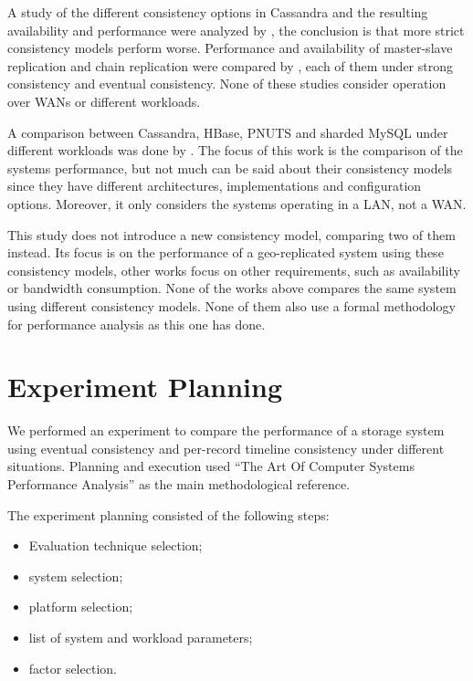 \documentclass[man,floatsintext,12pt]{apa6}
\begin{document}
A study of the different consistency options in Cassandra and the resulting
availability and performance were analyzed by \textcites{Beyer2011}, the
conclusion is that more strict consistency models perform worse. Performance
and availability of master-slave replication and chain replication were
compared by \textcites{vanRenesse2004}, each of them under strong consistency
and eventual consistency. None of these studies consider operation over WANs or
different workloads.

A comparison between Cassandra, HBase, PNUTS and sharded MySQL under different
workloads was done by \textcites{Cooper2010}. The focus of this work is the
comparison of the systems performance, but not much can be said about their
consistency models since they have different architectures, implementations and
configuration options. Moreover, it only considers the systems operating in a
LAN, not a WAN.

This study does not introduce a new consistency model, comparing two of them
instead. Its focus is on the performance of a geo-replicated system using these
consistency models, other works focus on other requirements, such as
availability or bandwidth consumption. None of the works above compares the
same system using different consistency models. None of them also use a formal
methodology for performance analysis as this one has done.

\section{Experiment Planning}

We performed an experiment to compare the performance of a storage system using
eventual consistency and per-record timeline consistency under different
situations. Planning and execution used ``The Art Of Computer Systems
Performance Analysis'' \parencite{Jain1991} as the main methodological reference.

The experiment planning consisted of the following steps:

\begin{itemize}
\item Evaluation technique selection;
\item system selection;
\item platform selection;
\item list of system and workload parameters;
\item factor selection.
\end{itemize}
\end{document}

